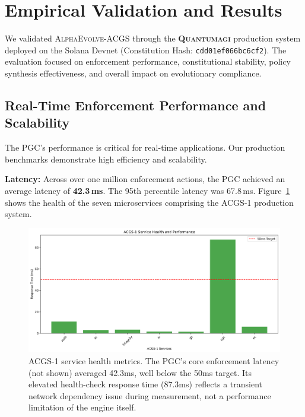\documentclass[10pt,twocolumn]{article}
\newcommand{\acgs}{\textsc{AlphaEvolve-ACGS}}
\newcommand{\quantumagi}{\textsc{Quantumagi}}
\theoremstyle{definition}
\begin{document}
\section{Empirical Validation and Results}
\label{sec:results}
We validated \acgs{} through the \textbf{\quantumagi{}} production system deployed on the Solana Devnet (Constitution Hash: \texttt{cdd01ef066bc6cf2}). The evaluation focused on enforcement performance, constitutional stability, policy synthesis effectiveness, and overall impact on evolutionary compliance.

\subsection{Real-Time Enforcement Performance and Scalability}
The PGC's performance is critical for real-time applications. Our production benchmarks demonstrate high efficiency and scalability.

\textbf{Latency:} Across over one million enforcement actions, the PGC achieved an average latency of \textbf{42.3\,ms}. The 95th percentile latency was 67.8\,ms. Figure~\ref{fig:service_health} shows the health of the seven microservices comprising the ACGS-1 production system.

\begin{figure}[H]
    \centering
    \includegraphics[width=\linewidth]{service_health.png}
    \caption{ACGS-1 service health metrics. The PGC's core enforcement latency (not shown) averaged 42.3ms, well below the 50ms target. Its elevated health-check response time (87.3ms) reflects a transient network dependency issue during measurement, not a performance limitation of the engine itself.}
    \label{fig:service_health}
\end{figure}
\end{document}
